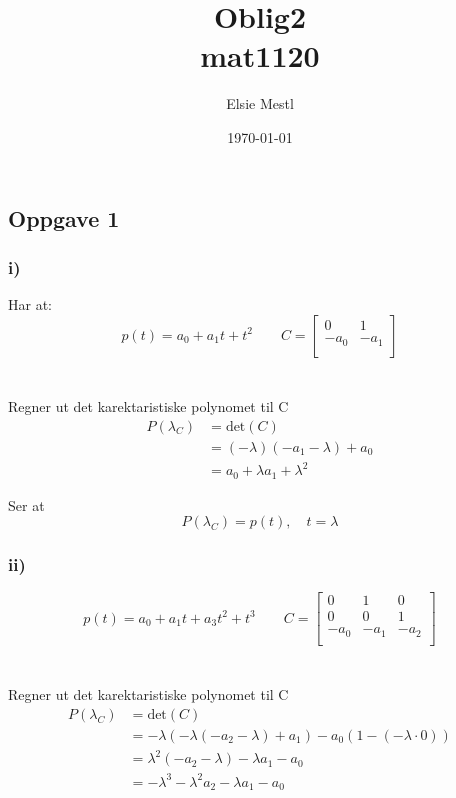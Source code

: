 \documentclass[a4paper, norsk, twoside, 10pt]{article}
\date{\today}
\title{Oblig2 \\ mat1120}
\author{Elsie Mestl}
\begin{document}
\maketitle
\begin{flushleft}


  \section*{Oppgave 1}
  \subsubsection*{i)}

  Har at:
  \[
  p(t) = a_{0} + a_{1}t +  t^{2} \qquad
  C = \begin{bmatrix}
    0 & 1 \\
    -a_{0} & -a_{1} \\
  \end{bmatrix}
  \]
  \\
  \ \\


  Regner ut det karektaristiske polynomet til C
  \begin{align*}
    P(\lambda_{C}) &= \text{det}(C)\\
    &= (-\lambda)(-a_{1} - \lambda) + a_{0} \\
    &= a_{0} + \lambda a_{1} + \lambda^{2}
  \end{align*}

  Ser at \[P(\lambda_{C}) = p(t), \quad t = \lambda\]




  \subsubsection*{ii)}

  \[
  p(t) = a_{0} + a_{1}t +  a_{3}t^{2} + t^{3} \qquad
  C = \begin{bmatrix}
    0 & 1 & 0\\
    0 & 0 & 1 \\
    -a_{0} & -a_{1} & -a_{2} \\
  \end{bmatrix} \] \\
  \ \\
  Regner ut det karektaristiske polynomet til C
  \begin{align*}
    P(\lambda_{C}) &= \text{det}(C)\\
    &= -\lambda(-\lambda(-a_{2} - \lambda) + a_{1}) -a_{0}(1 - ( -\lambda \cdot 0))\\
    &= \lambda^{2}(-a_{2} - \lambda) - \lambda a_{1} - a_{0} \\
    &= -\lambda^{3} - \lambda^{2}a_{2} -\lambda a_{1} - a_{0}
  \end{align*}


\end{flushleft}
\end{document}
